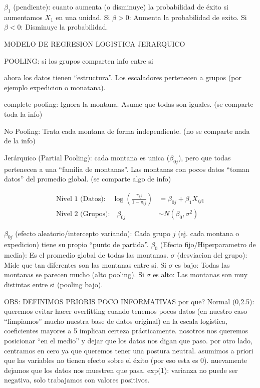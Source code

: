 \documentclass[
  letterpaper,
  DIV=11,
  numbers=noendperiod]{scrartcl}
\begin{document}
\(\beta_1\) (pendiente): cuanto aumenta (o disminuye) la probabilidad de
éxito si aumentamos \(X_1\) en una unidad. Si \(\beta > 0\): Aumenta la
probabilidad de exito. Si \(\beta < 0\): Disminuye la probabilidad.

MODELO DE REGRESION LOGISTICA JERARQUICO

POOLING: si los grupos comparten info entre si

ahora los datos tienen ``estructura''. Los escaladores pertenecen a
grupos (por ejemplo expedicion o monatana).

complete pooling: Ignora la montana. Asume que todas son iguales. (se
comparte toda la info)

No Pooling: Trata cada montana de forma independiente. (no se comparte
nada de la info)

Jerárquico (Partial Pooling): cada montana es unica (\(\beta_{0j}\)),
pero que todas pertenecen a una ``familia de montanas''. Las montanas
con pocos datos ``toman datos'' del promedio global. (se comparte algo
de info)

\[\begin{aligned}
\text{Nivel 1 (Datos):} \quad \log\left(\frac{\pi_{ij}}{1-\pi_{ij}}\right) & = \beta_{0j} + \beta_1 X_{ij1} \\
\text{Nivel 2 (Grupos):} \quad \beta_{0j} & \sim N(\beta_0, \sigma^2)
\end{aligned}\]

\(\beta_{0j}\) (efecto aleatorio/intercepto variando): Cada grupo \(j\)
(ej. cada montana o expedicion) tiene su propio ``punto de partida''.
\(\beta_0\) (Efecto fijo/Hiperparametro de media): Es el promedio global
de todas las montanas. \(\sigma\) (desviacion del grupo): Mide que tan
diferentes son las montanas entre si. Si \(\sigma\) es bajo: Todas las
montanas se parecen mucho (alto pooling). Si \(\sigma\) es alto: Las
montanas son muy distintas entre si (pooling bajo).

OBS: DEFINIMOS PRIORIS POCO INFORMATIVAS por que? Normal (0,2.5):
queremos evitar hacer overfitting cuando tenemos pocos datos (en nuestro
caso ``limpiamos'' mucho nuestra base de datos original) en la escala
logística, coeficientes mayores a 5 implican certeza prácticamente.
nosotros nos queremos posicionar ``en el medio'' y dejar que los datos
nos digan que paso. por otro lado, centramos en cero ya que queremos
tener una postura neutral. asumimos a priori que las variables no tienen
efecto sobre el éxito (por eso esta es 0). nuevamente dejamos que los
datos nos muestren que pasa. exp(1): varianza no puede ser negativa,
solo trabajamos con valores positivos.
\end{document}
